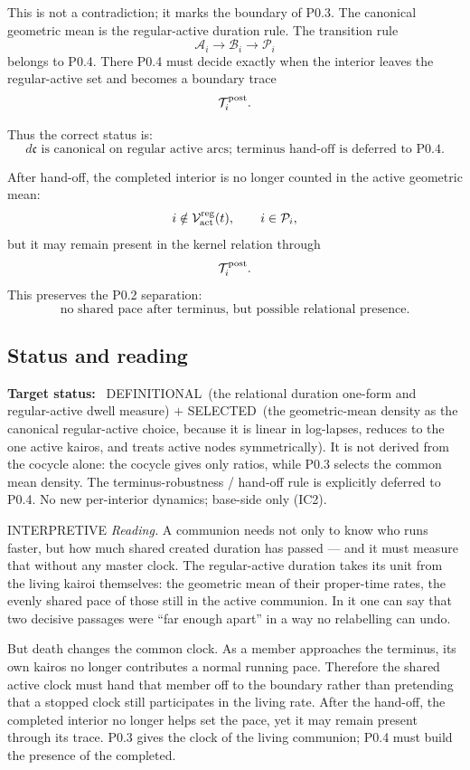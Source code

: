 \documentclass[11pt,a4paper]{article}
\newcommand{\stDef}{\textcolor{cDef}{\textsf{\small DEFINITIONAL}}}
\newcommand{\stSelected}{\textcolor{cSel}{\textsf{\small SELECTED}}}
\newcommand{\stInterp}{\textcolor{cInt}{\textsf{\small INTERPRETIVE}}}
\theoremstyle{definition}
\theoremstyle{plain}
\theoremstyle{remark}
\begin{document}
This is not a contradiction; it marks the boundary of P0.3. The canonical
geometric mean is the regular-active duration rule. The transition rule
\[
\mathcal A_i
\longrightarrow
\mathcal B_i
\longrightarrow
\mathcal P_i
\]
belongs to P0.4. There P0.4 must decide exactly when the interior leaves the
regular-active set and becomes a boundary trace
\[
\mathcal T_i^{\rm post}.
\]

Thus the correct status is:
\[
\boxed{
d\mathfrak c
\text{ is canonical on regular active arcs; terminus hand-off is deferred to P0.4.}
}
\]

After hand-off, the completed interior is no longer counted in the active
geometric mean:
\[
i\notin\mathcal V_{\rm act}^{\rm reg}(t),
\qquad
i\in\mathcal P_i,
\]
but it may remain present in the kernel relation through
\[
\mathcal T_i^{\rm post}.
\]
This preserves the P0.2 separation:
\[
\text{no shared pace after terminus, but possible relational presence.}
\]

\subsection{Status and reading}

\textbf{Target status:}~
\stDef\ (the relational duration one-form and regular-active dwell measure)
\(+\)
\stSelected\ (the geometric-mean density as the canonical regular-active choice,
because it is linear in log-lapses, reduces to the one active kairos, and treats
active nodes symmetrically).
It is not derived from the cocycle alone: the cocycle gives only ratios, while
P0.3 selects the common mean density. The terminus-robustness / hand-off rule is
explicitly deferred to P0.4. No new per-interior dynamics; base-side only (IC2).

\medskip
\stInterp\quad
\emph{Reading.}
A communion needs not only to know who runs faster, but how much shared created
duration has passed --- and it must measure that without any master clock. The
regular-active duration takes its unit from the living kairoi themselves: the
geometric mean of their proper-time rates, the evenly shared pace of those still
in the active communion. In it one can say that two decisive passages were
``far enough apart'' in a way no relabelling can undo.

But death changes the common clock. As a member approaches the terminus, its own
kairos no longer contributes a normal running pace. Therefore the shared active
clock must hand that member off to the boundary rather than pretending that a
stopped clock still participates in the living rate. After the hand-off, the
completed interior no longer helps set the pace, yet it may remain present through
its trace. P0.3 gives the clock of the living communion; P0.4 must build the
presence of the completed.
\end{document}
